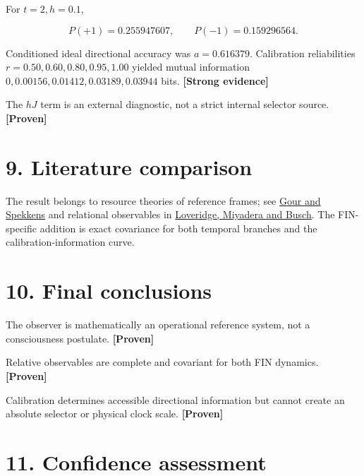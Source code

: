 \documentclass[11pt,a4paper,openany]{report}
\newcommand{\statusProven}{\textcolor{fingreen}{[Proven]}}
\newcommand{\statusStrong}{\textcolor{finblue}{[Strong evidence]}}
\begin{document}
For \(t=2,h=0.1\),

\[
P(+1)=0.255947607,\qquad P(-1)=0.159296564.
\]

Conditioned ideal directional accuracy was \(a=0.616379\). Calibration reliabilities \(r=0.50,0.60,0.80,0.95,1.00\) yielded mutual information \(0,0.00156,0.01412,0.03189,0.03944\) bits. \textbf{\statusStrong{}}

The \(hJ\) term is an external diagnostic, not a strict internal selector source. \textbf{\statusProven{}}

\section{9. Literature comparison}

The result belongs to resource theories of reference frames; see \href{https://arxiv.org/abs/0711.0043}{Gour and Spekkens} and relational observables in \href{https://arxiv.org/abs/1703.10434}{Loveridge, Miyadera and Busch}. The FIN-specific addition is exact covariance for both temporal branches and the calibration-information curve.

\section{10. Final conclusions}

The observer is mathematically an operational reference system, not a consciousness postulate. \textbf{\statusProven{}}

Relative observables are complete and covariant for both FIN dynamics. \textbf{\statusProven{}}

Calibration determines accessible directional information but cannot create an absolute selector or physical clock scale. \textbf{\statusProven{}}

\section{11. Confidence assessment}
\end{document}
